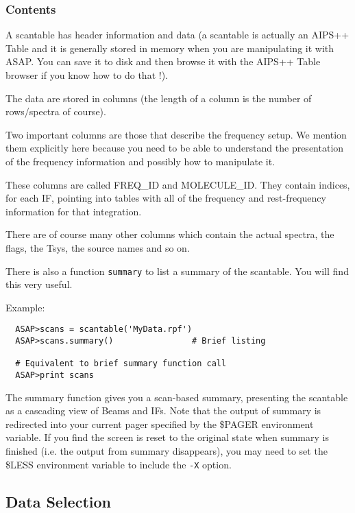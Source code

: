 \documentclass[11pt]{article}
\newcommand{\cmd}[1]{{\tt #1}}
\begin{document}
\subsubsection {Contents}

A scantable has header information and data
(a scantable is actually an AIPS++ Table and it is generally stored in
memory when you are manipulating it with ASAP.  You can save it to
disk and then browse it with the AIPS++ Table browser if you know how
to do that !).

The data are stored in columns (the length of a column is the number of
rows/spectra of course).

Two important columns are those that describe the frequency setup.  We mention
them explicitly here because you need to be able to understand the presentation
of the frequency information and possibly how to manipulate it.

These columns are called FREQ\_ID and MOLECULE\_ID.  They contain indices, for
each IF, pointing into tables with all of the frequency and rest-frequency
information for that integration. 

There are of course many other columns which contain the actual spectra,
the flags, the Tsys, the source names and so on.

There is also a function \cmd{summary} to list a summary of the scantable.
You will find this very useful.

Example:

\begin{verbatim}
  ASAP>scans = scantable('MyData.rpf')
  ASAP>scans.summary()                # Brief listing

  # Equivalent to brief summary function call
  ASAP>print scans
\end{verbatim}

The summary function gives you a scan-based summary, presenting the
scantable as a cascading view of Beams and IFs. Note that the output
of summary is redirected into your current pager specified by the
\$PAGER environment variable. If you find the screen is reset to the
original state when summary is finished (i.e. the output from summary
disappears), you may need to set the \$LESS environment variable to
include the \cmd{-X} option.

\subsection{Data Selection}
\label{sec:selection}
\end{document}
